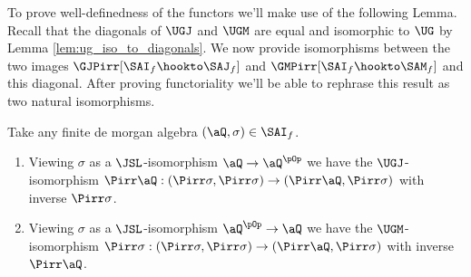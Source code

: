 \documentclass{article}
\begin{document}

\bigskip
To prove well-definedness of the functors we'll make use of the following Lemma. Recall that the diagonals of $\UGJ$ and $\UGM$ are equal and isomorphic to $\UG$ by Lemma \ref{lem:ug_iso_to_diagonals}. We now provide isomorphisms between the two images $\GJPirr[\SAI_f \hookto \SAJ_f]$ and $\GMPirr[\SAI_f \hookto  \SAM_f]$ and this diagonal. After proving functoriality we'll be able to rephrase this result as two natural isomorphisms.
\bigskip

\begin{lemma}
\label{lem:sai_induces_ugjm_iso}
\item
Take any finite de morgan algebra $(\aQ,\sigma) \in \SAI_f$.
\begin{enumerate}
\item
Viewing $\sigma$ as a $\JSL$-isomorphism $\aQ \to \aQ^{\pOp}$ we have the $\UGJ$-isomorphism $\Pirr\aQ : (\Pirr\sigma,\Pirr\sigma) \to (\Pirr\aQ,\Pirr\sigma)$ with inverse $\Pirr\sigma$.
\item
Viewing $\sigma$ as a $\JSL$-isomorphism $\aQ^{\pOp} \to \aQ$ we have the $\UGM$-isomorphism $\Pirr\sigma : (\Pirr\sigma,\Pirr\sigma) \to (\Pirr\aQ,\Pirr\sigma)$ with inverse $\Pirr\aQ$.
\end{enumerate}
\end{lemma}
\end{document}
